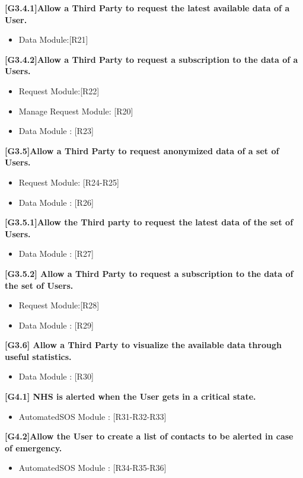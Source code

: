 \textbf{[G3.4.1]Allow a Third Party to request the latest available data of a User.}
\begin{itemize}
	\item Data Module:[R21]
\end{itemize}

\textbf{[G3.4.2]Allow a Third Party to request a subscription to the data of a
Users.}
\begin{itemize}
	\item Request Module:[R22]
	\item  Manage Request Module: [R20]
	\item Data Module : [R23]
\end{itemize}

\textbf{[G3.5]Allow a Third Party to request anonymized data of a set of Users.}
\begin{itemize}
	\item Request Module: [R24-R25]
	\item Data Module : [R26]
\end{itemize}

\textbf{[G3.5.1]Allow the Third party to request the latest data of the set of Users.}
\begin{itemize}
	\item Data Module : [R27]
\end{itemize}

\textbf{[G3.5.2] Allow a Third Party to request a subscription to the data of the
set of Users.}
\begin{itemize}
	\item Request Module:[R28]
	\item Data Module : [R29]
\end{itemize}

\textbf{[G3.6] Allow a Third Party to visualize the available data through useful
statistics.}
\begin{itemize}
	\item Data Module : [R30]
\end{itemize}

\textbf{[G4.1] NHS is alerted when the User gets in a critical state.}
\begin{itemize}
	\item AutomatedSOS Module : [R31-R32-R33]
\end{itemize}

\textbf{[G4.2]Allow the User to create a list of contacts to be alerted in case of
emergency.}
\begin{itemize}
	\item AutomatedSOS Module : [R34-R35-R36]
\end{itemize}

